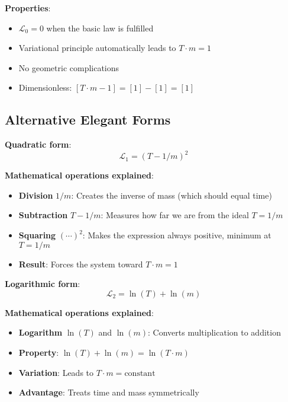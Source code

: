 \documentclass[12pt,a4paper]{article}
\newcommand{\Lag}{\mathcal{L}}
\theoremstyle{definition}
\theoremstyle{remark}
\begin{document}
	\textbf{Properties}:
	\begin{itemize}
		\item $\Lag_0 = 0$ when the basic law is fulfilled
		\item Variational principle automatically leads to $T \cdot m = 1$
		\item No geometric complications
		\item Dimensionless: $[T \cdot m - 1] = [1] - [1] = [1]$
	\end{itemize}
	
	\subsection{Alternative Elegant Forms}
	
	\textbf{Quadratic form}:
	\begin{equation}
		\Lag_1 = (T - 1/m)^2
		\label{eq:quadratic_form}
	\end{equation}
	
	\textbf{Mathematical operations explained}:
	\begin{itemize}
		\item \textbf{Division} $1/m$: Creates the inverse of mass (which should equal time)
		\item \textbf{Subtraction} $T - 1/m$: Measures how far we are from the ideal $T = 1/m$
		\item \textbf{Squaring} $(\cdots)^2$: Makes the expression always positive, minimum at $T = 1/m$
		\item \textbf{Result}: Forces the system toward $T \cdot m = 1$
	\end{itemize}
	
	\textbf{Logarithmic form}:
	\begin{equation}
		\Lag_2 = \ln(T) + \ln(m)
		\label{eq:logarithmic_form}
	\end{equation}
	
	\textbf{Mathematical operations explained}:
	\begin{itemize}
		\item \textbf{Logarithm} $\ln(T)$ and $\ln(m)$: Converts multiplication to addition
		\item \textbf{Property}: $\ln(T) + \ln(m) = \ln(T \cdot m)$
		\item \textbf{Variation}: Leads to $T \cdot m = \text{constant}$
		\item \textbf{Advantage}: Treats time and mass symmetrically
	\end{itemize}
	
\end{document}
